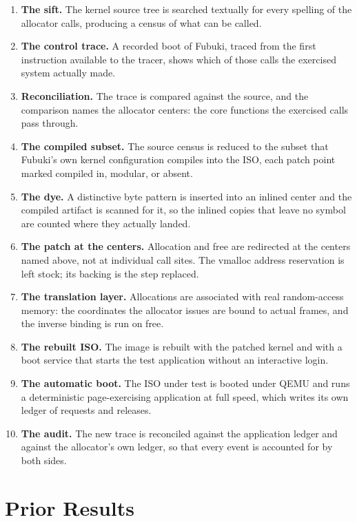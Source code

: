 \documentclass[11pt]{article}
\begin{document}
\begin{enumerate}
\item \textbf{The sift.} The kernel source tree is searched
textually for every spelling of the allocator calls, producing a
census of what can be called.
\item \textbf{The control trace.} A recorded boot of Fubuki,
traced from the first instruction available to the tracer, shows
which of those calls the exercised system actually made.
\item \textbf{Reconciliation.} The trace is compared against the
source, and the comparison names the allocator centers: the core
functions the exercised calls pass through.
\item \textbf{The compiled subset.} The source census is reduced
to the subset that Fubuki's own kernel configuration compiles into
the ISO, each patch point marked compiled in, modular, or absent.
\item \textbf{The dye.} A distinctive byte pattern is inserted
into an inlined center and the compiled artifact is scanned for it,
so the inlined copies that leave no symbol are counted where they
actually landed.
\item \textbf{The patch at the centers.} Allocation and free are
redirected at the centers named above, not at individual call
sites. The vmalloc address reservation is left stock; its backing
is the step replaced.
\item \textbf{The translation layer.} Allocations are associated
with real random-access memory: the coordinates the allocator
issues are bound to actual frames, and the inverse binding is run
on free.
\item \textbf{The rebuilt ISO.} The image is rebuilt with the
patched kernel and with a boot service that starts the test
application without an interactive login.
\item \textbf{The automatic boot.} The ISO under test is booted
under QEMU and runs a deterministic page-exercising application at
full speed, which writes its own ledger of requests and releases.
\item \textbf{The audit.} The new trace is reconciled against the
application ledger and against the allocator's own ledger, so that
every event is accounted for by both sides.
\end{enumerate}

\section{Prior Results}
\end{document}
